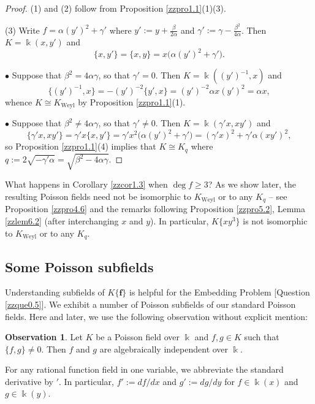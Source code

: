\documentclass[12pt]{amsart}
\theoremstyle{plain}
\numberwithin{theorem}{section}
\numberwithin{equation}{theorem}
\theoremstyle{definition}
\newtheorem{obs}[theorem]{Observation}
\newcommand \bff {{\mathbf{f}}}
\DeclareMathOperator{\Weyl}{Weyl}
\newcommand \Kweyl {K_{\Weyl}}
\begin{document}
\begin{proof}
(1) and (2) follow from Proposition 
\ref{zzpro1.1}(1)(3).

(3) Write $f = \alpha ( y' )^2 + \gamma'$ 
where $y' := y + \frac\beta{2\alpha}$ 
and $\gamma' := \gamma - 
\frac{\beta^2}{4 \alpha}$. Then 
$K = \Bbbk(x,y')$ and
$$\{x,y'\} = \{x,y\} 
= x \bigl( \alpha ( y' )^2 + \gamma' \bigr).$$

$\bullet$ Suppose that $\beta^2 
= 4 \alpha \gamma$, so that $\gamma' = 0$. 
Then $K = \Bbbk( (y')^{-1}, x)$ and 
$$\{(y')^{-1}, x\} = -(y')^{-2} \{y',x\} 
= (y')^{-2} \alpha x (y')^2 =\alpha x,$$ 
whence $K \cong \Kweyl$ by Proposition 
\ref{zzpro1.1}(1).

$\bullet$ Suppose that $\beta^2 
\ne 4 \alpha \gamma$, so that 
$\gamma' \ne 0$. Then 
$K = \Bbbk(\gamma' x, xy')$ and
$$\{\gamma' x, xy'\} = \gamma' x \{x,y'\} 
= \gamma' x^2 \bigl( \alpha ( y' )^2 
+ \gamma' \bigr) = (\gamma' x)^2 
+ \gamma' \alpha (xy')^2,$$
so Proposition \ref{zzpro1.1}(4) 
implies that $K \cong K_q$ where
$q := 2 \sqrt{- \gamma' \alpha} 
= \sqrt{\beta^2 - 4 \alpha \gamma}$.
\end{proof}

What happens in Corollary \ref{zzcor1.3} 
when $\deg f \ge 3$? As we show later, the 
resulting Poisson fields need not be 
isomorphic to $\Kweyl$ or to any 
$K_q$ -- see Proposition \ref{zzpro4.6} 
and the remarks following Proposition 
\ref{zzpro5.2}, Lemma \ref{zzlem6.2} 
(after interchanging $x$ and $y$).  In 
particular, $K\{xy^3\}$ is not 
isomorphic to $\Kweyl$ or to any $K_q$.


\subsection{Some Poisson subfields}
\label{zzsec1.2}
Understanding subfields of $K\{\bff\}$ is helpful for 
the Embedding Problem [Question \ref{zzque0.5}].
We exhibit a number of Poisson subfields of our standard 
Poisson fields. Here and later, we use the following 
observation without explicit mention:

\begin{obs} \cite[Lemma 1.6(1)]{HTWZ1}
\label{zzobs1.4}
Let $K$ be a Poisson 
field over $\Bbbk$ and $f,g \in K$ such that $\{f,g\} \ne 0$. Then $f$ 
and $g$ are algebraically independent over $\Bbbk$.
\end{obs}


For any rational function field in one variable, we abbreviate the standard derivative by $'$.  In particular, $f' := df/dx$ and $g' := dg/dy$ for $f \in \Bbbk(x)$ and $g \in \Bbbk(y)$.
\end{document}
